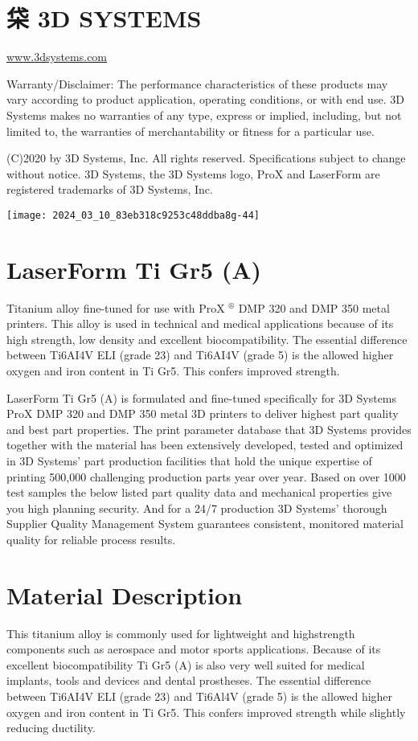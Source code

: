\documentclass[10pt]{article}
\begin{document}
\section*{柋 3D SYSTEMS}
\href{http://www.3dsystems.com}{www.3dsystems.com}

Warranty/Disclaimer: The performance characteristics of these products may vary according to product application, operating conditions, or with end use. 3D Systems makes no warranties of any type, express or implied, including, but not limited to, the warranties of merchantability or fitness for a particular use.

(C)2020 by 3D Systems, Inc. All rights reserved. Specifications subject to change without notice. 3D Systems, the 3D Systems logo, ProX and LaserForm are registered trademarks of 3D Systems, Inc.

\begin{center}
\texttt{[image: 2024\_03\_10\_83eb318c9253c48ddba8g-44]}
\end{center}

\section*{LaserForm Ti Gr5 (A)}
Titanium alloy fine-tuned for use with ProX ${ }^{\circledR}$ DMP 320 and DMP 350 metal printers. This alloy is used in technical and medical applications because of its high strength, low density and excellent biocompatibility. The essential difference between Ti6AI4V ELI (grade 23) and Ti6AI4V (grade 5) is the allowed higher oxygen and iron content in Ti Gr5. This confers improved strength.

LaserForm Ti Gr5 (A) is formulated and fine-tuned specifically for 3D Systems ProX DMP 320 and DMP 350 metal 3D printers to deliver highest part quality and best part properties. The print parameter database that 3D Systems provides together with the material has been extensively developed, tested and optimized in 3D Systems' part production facilities that hold the unique expertise of printing 500,000 challenging production parts year over year. Based on over 1000 test samples the below listed part quality data and mechanical properties give you high planning security. And for a 24/7 production 3D Systems' thorough Supplier Quality Management System guarantees consistent, monitored material quality for reliable process results.

\section*{Material Description}
This titanium alloy is commonly used for lightweight and highstrength components such as aerospace and motor sports applications. Because of its excellent biocompatibility Ti Gr5 (A) is also very well suited for medical implants, tools and devices and dental prostheses. The essential difference between Ti6AI4V ELI (grade 23) and Ti6Al4V (grade 5) is the allowed higher oxygen and iron content in Ti Gr5. This confers improved strength while slightly reducing ductility.
\end{document}
